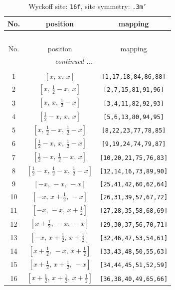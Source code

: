 \documentclass[fleqn,8pt]{jsarticle}
\begin{document}
\renewcommand{\arraystretch}{1.2}
\begin{longtable}{ccc}
\caption{Wyckoff site: {\tt 16f}, site symmetry: {\tt .3m'}}
 \\
 \hline \hline
No. & position & mapping \\ \hline \endfirsthead

\multicolumn{2}{l}{\tablename\ \thetable{}} \\
 \hline \hline
No. & position & mapping \\ \hline \endhead

 \hline \hline
\multicolumn{2}{r}{\footnotesize\it continued ...} \\ \endfoot

 \hline \hline
\multicolumn{2}{r}{} \\ \endlastfoot

1 & $\left[ x,\, x,\, x \right]$ & {\tt [1,17,18,84,86,88]} \\ \hline
2 & $\left[ x,\, \frac{1}{2} - x,\, x \right]$ & {\tt [2,7,15,81,91,96]} \\ \hline
3 & $\left[ x,\, x,\, \frac{1}{2} - x \right]$ & {\tt [3,4,11,82,92,93]} \\ \hline
4 & $\left[ \frac{1}{2} - x,\, x,\, x \right]$ & {\tt [5,6,13,80,94,95]} \\ \hline
5 & $\left[ x,\, \frac{1}{2} - x,\, \frac{1}{2} - x \right]$ & {\tt [8,22,23,77,78,85]} \\ \hline
6 & $\left[ \frac{1}{2} - x,\, x,\, \frac{1}{2} - x \right]$ & {\tt [9,19,24,74,79,87]} \\ \hline
7 & $\left[ \frac{1}{2} - x,\, \frac{1}{2} - x,\, x \right]$ & {\tt [10,20,21,75,76,83]} \\ \hline
8 & $\left[ \frac{1}{2} - x,\, \frac{1}{2} - x,\, \frac{1}{2} - x \right]$ & {\tt [12,14,16,73,89,90]} \\ \hline
9 & $\left[ - x,\, - x,\, - x \right]$ & {\tt [25,41,42,60,62,64]} \\ \hline
10 & $\left[ - x,\, x + \frac{1}{2},\, - x \right]$ & {\tt [26,31,39,57,67,72]} \\ \hline
11 & $\left[ - x,\, - x,\, x + \frac{1}{2} \right]$ & {\tt [27,28,35,58,68,69]} \\ \hline
12 & $\left[ x + \frac{1}{2},\, - x,\, - x \right]$ & {\tt [29,30,37,56,70,71]} \\ \hline
13 & $\left[ - x,\, x + \frac{1}{2},\, x + \frac{1}{2} \right]$ & {\tt [32,46,47,53,54,61]} \\ \hline
14 & $\left[ x + \frac{1}{2},\, - x,\, x + \frac{1}{2} \right]$ & {\tt [33,43,48,50,55,63]} \\ \hline
15 & $\left[ x + \frac{1}{2},\, x + \frac{1}{2},\, - x \right]$ & {\tt [34,44,45,51,52,59]} \\ \hline
16 & $\left[ x + \frac{1}{2},\, x + \frac{1}{2},\, x + \frac{1}{2} \right]$ & {\tt [36,38,40,49,65,66]} \\
\end{longtable}
\end{document}
